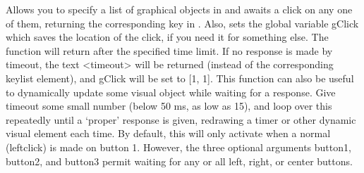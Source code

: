 \documentclass[letterpaper,10pt,english]{sphinxmanual}
\begin{document}
\sphinxAtStartPar
Allows you to specify a list of graphical objects in  and awaits a click   on any one of them, returning the corresponding key in .  Also, sets the    global variable gClick which saves the location of the click, if    you need it for something else.  The function will return after the specified time limit.    If no response is made by timeout, the text \textless{}timeout\textgreater{} will be returned (instead of the corresponding keylist element), and gClick will be set to {[}\sphinxhyphen{}1, \sphinxhyphen{}1{]}.  This function can also be useful to dynamically update some visual object while waiting for a response.  Give timeout some small number (below 50 ms, as low as 1\sphinxhyphen{}5), and loop over this repeatedly until a ‘proper’ response is given, redrawing a timer or other dynamic visual element each time.  By default, this will only activate when a normal (left\sphinxhyphen{}click) is made on button 1.  However, the three optional arguments button1, button2, and button3 permit waiting for any or all left, right, or center buttons.

\sphinxAtStartPar
{}

\begin{sphinxVerbatim}[commandchars=\\\{\}]
\end{sphinxVerbatim}

\sphinxAtStartPar
{}
\end{document}
